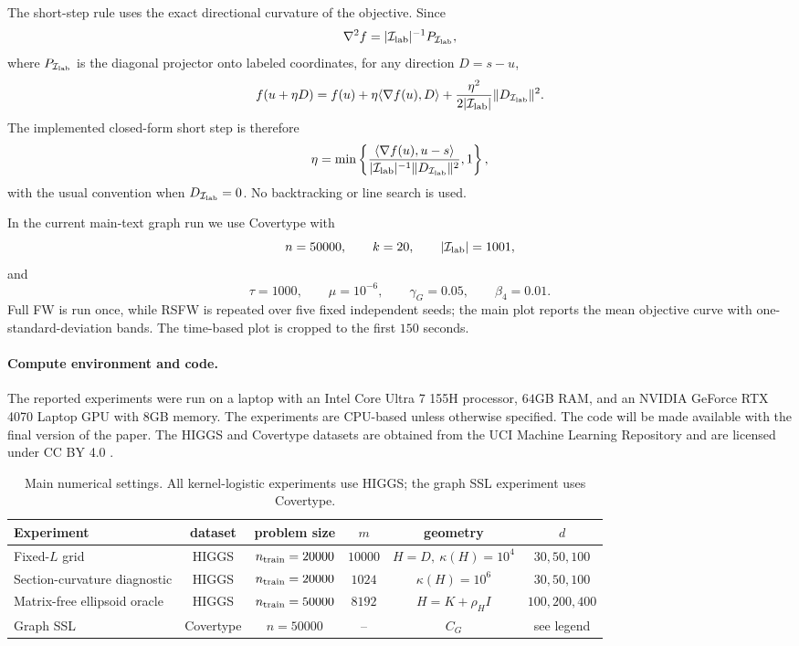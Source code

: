 \documentclass{article}
\begin{document}
The short-step rule uses the exact directional curvature of the objective.
Since
\[
    \nabla^2 f=|\mathcal I_{\rm lab}|^{-1}P_{\mathcal I_{\rm lab}},
\]
where \(P_{\mathcal I_{\rm lab}}\) is the diagonal projector onto labeled coordinates, for
any direction \(D=s-u\),
\[
    f(u+\eta D)
    =
    f(u)+\eta\langle\nabla f(u),D\rangle
    +\frac{\eta^2}{2|\mathcal I_{\rm lab}|}\|D_{\mathcal I_{\rm lab}}\|^2.
\]
The implemented closed-form short step is therefore
\[
    \eta
    =
    \min\left\{
    \frac{\langle\nabla f(u),u-s\rangle}
    {|\mathcal I_{\rm lab}|^{-1}\|D_{\mathcal I_{\rm lab}}\|^2},
    1
    \right\},
\]
with the usual convention when \(D_{\mathcal I_{\rm lab}}=0\). No backtracking or line
search is used.

In the current main-text graph run we use Covertype with
\[
    n=50000,\qquad k=20,\qquad |\mathcal I_{\rm lab}|=1001,
\]
and
\[
    \tau=1000,\qquad
    \mu=10^{-6},\qquad
    \gamma_G=0.05,\qquad
    \beta_4=0.01 .
\]
Full FW is run once, while RSFW is repeated over five fixed independent seeds;
the main plot reports the mean objective curve with one-standard-deviation
bands. The time-based plot is cropped to the first \(150\) seconds.

\paragraph{Compute environment and code.}
The reported experiments were run on a laptop with an Intel Core Ultra 7 155H
processor, \(64\)GB RAM, and an NVIDIA GeForce RTX 4070 Laptop GPU with \(8\)GB
memory. The experiments are CPU-based unless otherwise specified. The code will
be made available with the final version of the paper. The HIGGS and Covertype datasets are obtained from the UCI Machine Learning
Repository and are licensed under CC BY 4.0
\cite{Whiteson2014HIGGSUCI,Blackard1998CovertypeUCI}.

\begin{table}[t]
\centering
\small
\caption{Main numerical settings. All kernel-logistic experiments use HIGGS;
the graph SSL experiment uses Covertype.}
\label{tab:numerics_settings}
\begin{tabular}{@{}lccccc@{}}
\toprule
Experiment & dataset & problem size & \(m\) & geometry & \(d\) \\
\midrule
Fixed-\(L\) grid
& HIGGS & \(n_{\rm train}=20000\) & \(10000\)
& \(H=D,\ \kappa(H)=10^4\)
& \(30,50,100\) \\
Section-curvature diagnostic
& HIGGS & \(n_{\rm train}=20000\) & \(1024\)
& \(\kappa(H)=10^6\)
& \(30,50,100\) \\
Matrix-free ellipsoid oracle
& HIGGS & \(n_{\rm train}=50000\) & \(8192\)
& \(H=K+\rho_H I\)
& \(100,200,400\) \\
Graph SSL
& Covertype & \(n=50000\) & --
& \(C_G\)
& see legend \\
\bottomrule
\end{tabular}
\end{table}
\end{document}
